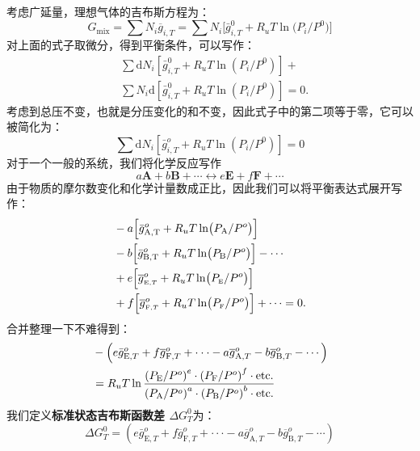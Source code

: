 {
    \scriptsize
    考虑广延量，理想气体的吉布斯方程为：
    \[
        G_{\mathrm{mix}}=\sum N_{i}\overline{{{g}}}_{i,T}=\sum N_{i}\bigl[\bar{g}_{i,T}^{0}+R_{u}T\ln\bigl(P_{i}/P^{0}\bigr)\bigr]
    \]
    对上面的式子取微分，得到平衡条件，可以写作：
    \[
        \begin{aligned}
        &\sum{\mathrm{d}{N}}_{i}\left[\bar{g}_{i,T}^{0}+R_{u}T\ln\left(P_{i}/P^{0}\right)\right]+\\
        &\sum{N}_{i}\mathrm{d}\left[\bar{g}_{i,T}^{0}+R_{u}T\ln\left(P_{i}/P^{0}\right)\right]=0.
        \end{aligned}
    \]
    考虑到总压不变，也就是分压变化的和不变，因此式子中的第二项等于零，它可以被简化为：
    \[\sum{\mathrm{d}{N}}_{i}\left[\bar{g}_{i,T}^{o}+R_{u}T\ln\left(P_{i}/P^{0}\right)\right]=0\]
    对于一个一般的系统，我们将化学反应写作
    \[a\mathbf{A}+b\mathbf{B}+\cdots\leftrightarrow e\mathbf{E}+f\mathbf{F}+\cdots\]
    由于物质的摩尔数变化和化学计量数成正比，因此我们可以将平衡表达式展开写作：
    \[
        \begin{aligned}
            &-a\Bigl[\bar{g}_\mathrm{A,T}^{o}+R_{u}T\ln\bigl(P_{\mathrm{A}}/P^{o}\bigr)\Bigr]\\
            &-b\Bigl[\bar{g}_{\mathrm{B,T}}^{o}+R_{u}T\ln\bigl(P_{\mathrm{B}}/P^{o}\bigr)\Bigr]-\cdots\\
            &+e\Bigl[\overline{{{g}}}_{\scriptscriptstyle\mathrm{E,}T}^{o}+R_{u}T\ln\bigl(P_{\scriptscriptstyle\mathrm{E}}/P^{o}\bigr)\Bigr]\\
            &+f\Bigl[\overline{{{g}}}_{\scriptscriptstyle\mathrm{F,}T}^{o}+R_{u}T\ln\bigl(P_{\scriptscriptstyle\mathrm{F}}/P^{o}\bigr)\Bigr]+\cdots=0.
        \end{aligned}
    \]
    合并整理一下不难得到：
    \[
        \begin{aligned}
            &-\Bigl(e\bar{g}_{\mathrm{E},T}^{o}+f\overline{{{g}}}_{\mathrm{F},T}^{o}+\cdot\cdot\cdot-a\overline{{{g}}}_{\mathrm{A},T}^{o}-b\overline{{{g}}}_{\mathrm{B},T}^{o}-\cdots\Bigr)\\
            &=R_{u}T\ln{\frac{\left(P_{\mathrm{E}}/P^{o}\right)^{e}\cdot\left(P_{\mathrm{F}}/P^{o}\right)^{f}\cdot\mathrm{etc.}}{\left(P_{\mathrm{A}}/P^{o}\right)^{a}\cdot\left(P_{\mathrm{B}}/P^{o}\right)^{b}\cdot\mathrm{etc.}}}
        \end{aligned}\]
}
我们定义\textbf{标准状态吉布斯函数差 $\Delta G_T^0$}为：
\begin{equation}
    \Delta G_T^0 = (e\bar{g}_{\mathrm{E},T}^{o}+f\overline{{{g}}}_{\mathrm{F},T}^{o}+\cdot\cdot\cdot-a\overline{{{g}}}_{\mathrm{A},T}^{o}-b\overline{{{g}}}_{\mathrm{B},T}^{o}-\cdots)
\end{equation}
